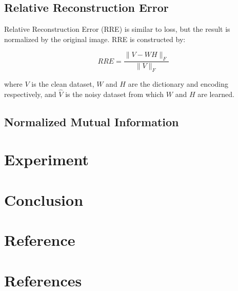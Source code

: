 \documentclass{article} %
\begin{document}
\subsection{Relative Reconstruction Error}
Relative Reconstruction Error (RRE) is similar to loss, but the result is normalized by the original image. RRE is constructed by:

\[RRE = \frac{\|V - WH\|_F}{\|V\|_F}\]

where $V$ is the clean dataset, $W$ and $H$ are the dictionary and encoding respectively, and $\hat{V}$ is the noisy dataset from which $W$ and $H$ are learned.

\subsection{Normalized Mutual Information}



\section{Experiment}

\section{Conclusion}

\section{Reference}

\section{References}


\end{document}
